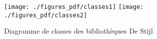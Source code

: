 \begin{appendices}
%
%
%
%
%
%
%
%
%
%
%
%
%
%
%
%
%
%

 \begin{figure}[htbp]
\begin{center}
\texttt{[image: ./figures\_pdf/classes1]}
\texttt{[image: ./figures\_pdf/classes2]}
\caption{Diagramme de classes des bibliothèques De Stijl}
\label{fig:diag17}
\end{center}
\end{figure}
\FloatBarrier
\end{appendices}